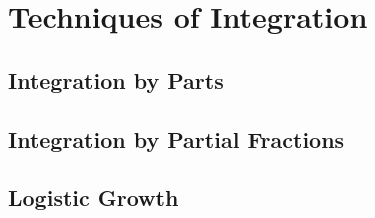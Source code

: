 \documentclass[../bccalc.tex]{subfiles}
\begin{document}
\chapter{Techniques of Integration}
\section{Integration by Parts}

\section{Integration by Partial Fractions}

\section{Logistic Growth}
\end{document}

